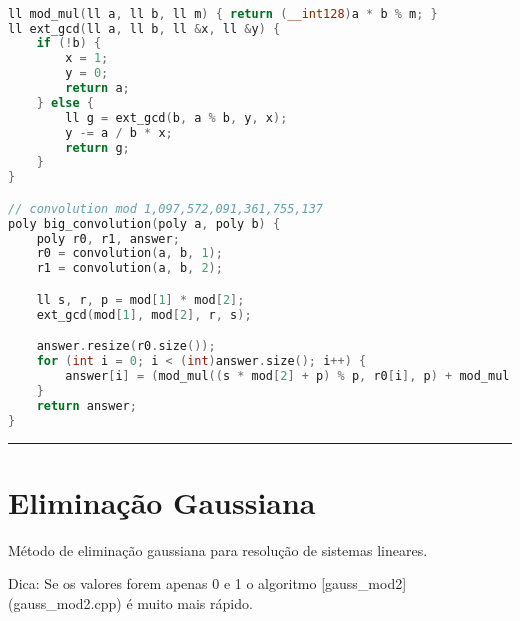 \documentclass[11pt, a4paper, twoside]{book}
\begin{document}
\hfill

\begin{lstlisting}[language=C++]

ll mod_mul(ll a, ll b, ll m) { return (__int128)a * b % m; }
ll ext_gcd(ll a, ll b, ll &x, ll &y) {
    if (!b) {
        x = 1;
        y = 0;
        return a;
    } else {
        ll g = ext_gcd(b, a % b, y, x);
        y -= a / b * x;
        return g;
    }
}

// convolution mod 1,097,572,091,361,755,137
poly big_convolution(poly a, poly b) {
    poly r0, r1, answer;
    r0 = convolution(a, b, 1);
    r1 = convolution(a, b, 2);

    ll s, r, p = mod[1] * mod[2];
    ext_gcd(mod[1], mod[2], r, s);

    answer.resize(r0.size());
    for (int i = 0; i < (int)answer.size(); i++) {
        answer[i] = (mod_mul((s * mod[2] + p) % p, r0[i], p) + mod_mul((r * mod[1] + p) % p, r1[i], p) + p) % p;
    }
    return answer;
}
\end{lstlisting}

\hfill

\rule{\textwidth}{0.4pt}

\section{Eliminação Gaussiana}



Método de eliminação gaussiana para resolução de sistemas lineares.







Dica: Se os valores forem apenas 0 e 1 o algoritmo [gauss\_mod2](gauss\_mod2.cpp) é muito mais rápido. 


\hfill
\end{document}
